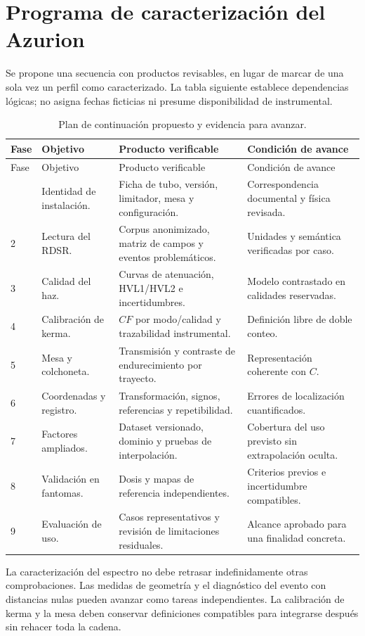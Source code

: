\section{Programa de caracterización del Azurion}
Se propone una secuencia con productos revisables, en lugar de marcar de una sola vez un perfil como caracterizado. La tabla siguiente establece dependencias lógicas; no asigna fechas ficticias ni presume disponibilidad de instrumental.
\begin{longtable}{p{12mm}p{33mm}p{57mm}p{36mm}}
\caption{Plan de continuación propuesto y evidencia para avanzar.}\\
\toprule
Fase & Objetivo & Producto verificable & Condición de avance\\\midrule\endfirsthead
\toprule Fase & Objetivo & Producto verificable & Condición de avance\\\midrule\endhead
\bottomrule\endfoot
1 & Identidad de instalación. & Ficha de tubo, versión, limitador, mesa y configuración. & Correspondencia documental y física revisada.\\
2 & Lectura del RDSR. & Corpus anonimizado, matriz de campos y eventos problemáticos. & Unidades y semántica verificadas por caso.\\
3 & Calidad del haz. & Curvas de atenuación, HVL1/HVL2 e incertidumbres. & Modelo contrastado en calidades reservadas.\\
4 & Calibración de kerma. & $CF$ por modo/calidad y trazabilidad instrumental. & Definición libre de doble conteo.\\
5 & Mesa y colchoneta. & Transmisión y contraste de endurecimiento por trayecto. & Representación coherente con $C$.\\
6 & Coordenadas y registro. & Transformación, signos, referencias y repetibilidad. & Errores de localización cuantificados.\\
7 & Factores ampliados. & Dataset versionado, dominio y pruebas de interpolación. & Cobertura del uso previsto sin extrapolación oculta.\\
8 & Validación en fantomas. & Dosis y mapas de referencia independientes. & Criterios previos e incertidumbre compatibles.\\
9 & Evaluación de uso. & Casos representativos y revisión de limitaciones residuales. & Alcance aprobado para una finalidad concreta.\\
\end{longtable}

La caracterización del espectro no debe retrasar indefinidamente otras comprobaciones. Las medidas de geometría y el diagnóstico del evento con distancias nulas pueden avanzar como tareas independientes. La calibración de kerma y la mesa deben conservar definiciones compatibles para integrarse después sin rehacer toda la cadena.

